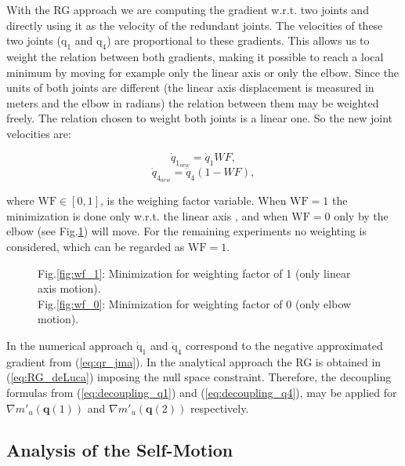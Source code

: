 With the RG approach we are computing the gradient w.r.t. two joints and directly using it as the velocity of the redundant joints. The velocities of these two joints ($\mathrm{q_1}$ and $\mathrm{q_4}$) are proportional to these gradients. This allows us to weight the relation between both gradients, making it possible to reach a local minimum
by moving for example only the linear axis or only the elbow. Since the units of both joints are different (the linear axis displacement is measured in meters and the elbow in radians) the relation between them may be weighted freely.
The relation chosen to weight both joints is a linear one. So the new joint velocities are: 

\begin{equation}
	{\dot{q}}_{1_{new}}  = {\dot{q}}_{1}WF,
	\label{eq:decoupling_q1} 
\end{equation} 
\begin{equation}
	{\dot{q}}_{4_{new}} = {\dot{q}}_{4}(1-WF),
	\label{eq:decoupling_q4}
\end{equation}


where $\mathrm{WF \in [0,1]}$, is the weighing factor variable.
When $\mathrm{WF=1}$ the minimization is done only w.r.t. the linear axis , and when $\mathrm{WF=0}$ only by the elbow (see Fig.\ref{fig:wf}) will move.
For the  remaining experiments no weighting is considered, which can be regarded as $\mathrm{WF=1}$.

\begin{figure}[!h]
	\centering	
	 	 	 	
	\caption{Fig.\ref{fig:wf_1}:  Minimization for weighting factor of 1 (only  linear axis motion). \\ Fig.\ref{fig:wf_0}: Minimization for weighting factor of 0 (only elbow motion). }
	\label{fig:wf}
\end{figure}

In the numerical approach $\mathrm{{\dot{q}}_{1}}$ and $\mathrm{{\dot{q}}_{4}}$ correspond to the negative approximated gradient from (\ref{eq:qr_jma}). In the analytical approach the RG is obtained in (\ref{eq:RG_deLuca}) imposing the null space constraint. Therefore, the decoupling formulas from (\ref{eq:decoupling_q1}) and (\ref{eq:decoupling_q4}), may be applied  for $\nabla m'_u(\mathbf{q}(1))$ and  $\nabla m'_u(\mathbf{q}(2))$ respectively.



\subsection{Analysis of the Self-Motion}





